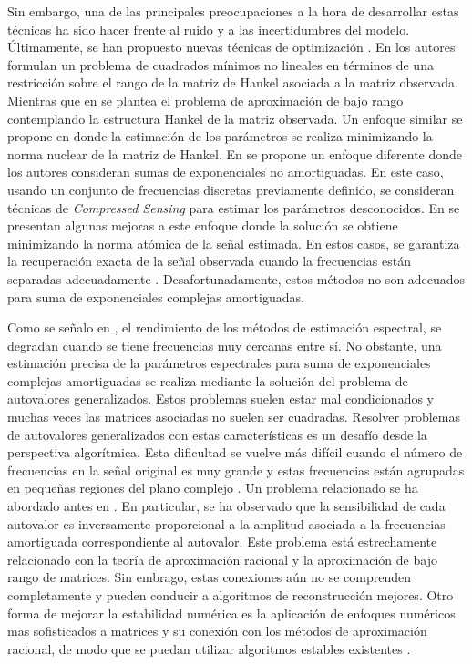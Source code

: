 Sin embargo, una de las principales preocupaciones a la hora de desarrollar estas técnicas ha sido hacer frente al ruido y a las incertidumbres del modelo. Últimamente, se han propuesto nuevas técnicas de optimización \cite{Andersson2014, Grussler2018}. En \cite{Andersson2014} los autores formulan un problema de cuadrados mínimos no lineales en términos de una restricción sobre el rango de la matriz de Hankel asociada a la matriz observada. Mientras que en \cite{Grussler2018} se plantea el problema de aproximación de bajo rango contemplando la estructura Hankel de la matriz observada. Un enfoque similar se propone en \cite{Ying2018} donde la estimación de los parámetros se realiza minimizando la norma nuclear de la matriz de Hankel. En \cite{Yang2018} se propone un enfoque diferente donde los autores consideran sumas de exponenciales no amortiguadas. En este caso, usando un conjunto de frecuencias discretas previamente definido, se consideran técnicas de \emph{Compressed Sensing} para estimar los parámetros desconocidos. En \cite{Yang2015,Yang2016} se presentan algunas mejoras a este enfoque donde la solución se obtiene minimizando la norma atómica de la señal estimada. En estos casos, se garantiza la recuperación exacta de la señal observada cuando la frecuencias están separadas adecuadamente \cite{Candes2014}. Desafortunadamente, estos métodos no son adecuados para suma de exponenciales complejas amortiguadas.

Como se señalo en \cite{Halder1997}, el rendimiento de los métodos de estimación espectral, se degradan cuando se tiene frecuencias muy cercanas entre sí. No obstante, una estimación precisa de la parámetros espectrales para suma de exponenciales complejas amortiguadas se realiza mediante la solución del problema de autovalores generalizados. Estos problemas suelen estar mal condicionados y muchas veces las matrices asociadas no suelen ser cuadradas. Resolver problemas de autovalores generalizados con estas características es un desafío desde la perspectiva algorítmica. Esta dificultad se vuelve más difícil cuando el número de frecuencias en la señal original es muy grande y estas frecuencias están agrupadas en pequeñas regiones del plano complejo \cite{Cuyt2018, BATENKOV2018, Li1997}. Un problema relacionado se ha abordado antes en \cite{Golub1999, Beckermann2007}. En particular, se ha observado que la sensibilidad de cada autovalor es inversamente proporcional a la amplitud asociada a la frecuencias amortiguada correspondiente al autovalor. Este problema está estrechamente relacionado con la teoría de aproximación racional y la aproximación de bajo rango de matrices. Sin embrago, estas conexiones aún no se comprenden completamente y pueden conducir a algoritmos de reconstrucción mejores. Otro forma de mejorar la estabilidad numérica es la aplicación de enfoques numéricos mas sofisticados a matrices y su conexión con los métodos de aproximación racional, de modo que se puedan utilizar algoritmos estables existentes \cite{Derevianko2022}.

